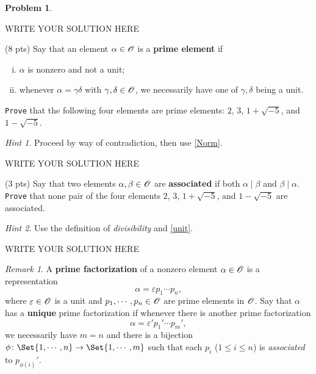 \documentclass[11pt]{article}
\theoremstyle{plain}
\theoremstyle{definition}
\newtheorem{problem}{Problem}
\theoremstyle{remark}
\newtheorem*{remark}{Remark}
\newtheorem*{hint}{Hint}
\numberwithin{equation}{problem}
\begin{document}
\begin{problem}
\begin{listinprob}
\begin{solution} %
WRITE YOUR SOLUTION HERE
\end{solution}\clearpage %


		\item (8 pts) Say that an element $\alpha\in\mathscr{O}$ is a \textbf{prime element} if 
		\begin{enumerate}[(i)]
			\item $\alpha$ is nonzero and not a unit;
			\item whenever $\alpha=\gamma\delta$ with $\gamma, \delta \in \mathscr{O}$, we necessarily have one of $\gamma, \delta$ being a unit.
		\end{enumerate}
		\texttt{Prove} that the following four elements are prime elements: $2$, $3$, $1+\sqrt{-5}$, and $1-\sqrt{-5}$.
		\begin{hint}
			Proceed by way of contradiction, then use \cref{Norm}.
		\end{hint}

\begin{solution} %
WRITE YOUR SOLUTION HERE
\end{solution}\clearpage %


		\item (3 pts) Say that two elements $\alpha,\beta\in\mathscr{O}$ are \textbf{associated} if both $\alpha\mid\beta$ and $\beta\mid\alpha$. 
		\texttt{Prove} that none pair of the four elements $2$, $3$, $1+\sqrt{-5}$, and $1-\sqrt{-5}$ are associated. 
		\begin{hint}
			Use the definition of \emph{divisibility} and \cref{unit}.
		\end{hint}

\begin{solution} %
WRITE YOUR SOLUTION HERE
\end{solution}\clearpage %

	\end{listinprob}
	\begin{remark}
		A \textbf{prime factorization} of a nonzero element $\alpha\in\mathscr{O}$ is a representation
		\[
			\alpha = \varepsilon p_1\cdots p_n,	
		\]
		where $\varepsilon\in\mathscr{O}$ is a unit and $p_1,\cdots,p_n\in\mathscr{O}$ are prime elements in $\mathscr{O}$. 
		Say that $\alpha$ has a \textbf{unique} prime factorization if whenever there is another prime factorization
		\[
			\alpha = \varepsilon' p_1'\cdots p_m', 
		\]
		we necessarily have $m=n$ and there is a bijection $\phi\colon\Set{1,\cdots,n}\to\Set{1,\cdots,m}$ such that each $p_i$ ($1\le i\le n$) is \emph{associated} to $p_{\phi(i)}'$.


\end{remark}
\end{problem}
\end{document}
